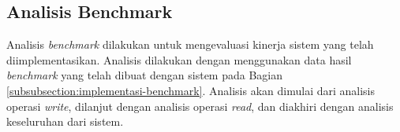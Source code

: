 \subsection{Analisis Benchmark}
\label{subsection:analisis-benchmark}

Analisis \textit{benchmark} dilakukan untuk mengevaluasi kinerja sistem yang telah diimplementasikan. Analisis dilakukan dengan menggunakan data hasil \textit{benchmark} yang telah dibuat dengan sistem pada Bagian \ref{subsubsection:implementasi-benchmark}. Analisis akan dimulai dari analisis operasi \textit{write}, dilanjut dengan analisis operasi \textit{read}, dan diakhiri dengan analisis keseluruhan dari sistem.




